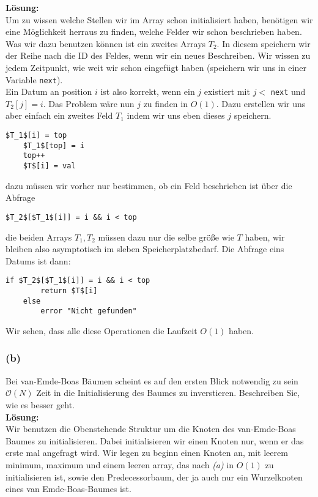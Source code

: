 \documentclass[11pt,a4paper,ngerman]{article}
\begin{document}
\noindent\textbf{Lösung:}\\
Um zu wissen welche Stellen wir im Array schon initialisiert haben, benötigen wir eine Möglichkeit herraus zu finden, welche Felder wir schon beschrieben haben. Was wir dazu benutzen können ist ein zweites Arrays $T_2$. In diesem speichern wir der Reihe nach die ID des Feldes, wenn wir ein neues Beschreiben. Wir wissen zu jedem Zeitpunkt, wie weit wir schon eingefügt haben (speichern wir uns in einer Variable \lstinline|next|).\\

Ein Datum an position $i$ ist also korrekt, wenn ein $j$ existiert mit $j <$ \lstinline|next| und $T_2[j] = i$. Das Problem wäre nun $j$ zu finden in $O(1)$. Dazu erstellen wir uns aber einfach ein zweites Feld $T_1$ indem wir uns eben dieses $j$ speichern.\\

\begin{lstlisting}[label="Einfügen eines neuen Datums"]
	$T_1$[i] = top
	$T_1$[top] = i
	top++
	$T$[i] = val
\end{lstlisting}
dazu müssen wir vorher nur bestimmen, ob ein Feld beschrieben ist über die Abfrage
\begin{lstlisting}[label="Darum existiert"]
	$T_2$[$T_1$[i]] = i && i < top
\end{lstlisting}
die beiden Arrays $T_1, T_2$ müssen dazu nur die selbe größe wie $T$ haben, wir bleiben also asymptotisch im sleben Speicherplatzbedarf. Die
Abfrage eins Datums ist dann:
\begin{lstlisting}[label="Datum ermitteln"]
	if $T_2$[$T_1$[i]] = i && i < top
		return $T$[i]
	else
		error "Nicht gefunden"
\end{lstlisting}

Wir sehen, dass alle diese Operationen die Laufzeit $O(1)$ haben.
\subsubsection*{(b)}

Bei van-Emde-Boas  Bäumen scheint es auf den ersten Blick notwendig zu sein $\mathcal{O}(N)$ Zeit in die Initialisierung des Baumes zu inverstieren. Beschreiben Sie, wie es besser geht.\\

\noindent\textbf{Lösung:}\\

Wir benutzen die Obenstehende Struktur um die Knoten des van-Emde-Boas Baumes zu initialisieren. Dabei initialisieren wir einen Knoten nur,
wenn er das erste mal angefragt wird. Wir legen zu beginn einen Knoten an, mit leerem minimum, maximum und einem leeren array,
das nach \emph{(a)} in $O(1)$ zu initialisieren ist, sowie den Predecessorbaum, der ja auch nur ein Wurzelknoten eines van Emde-Boas-Baumes ist.
\end{document}
